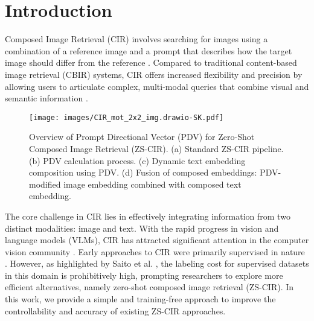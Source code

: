 \section{Introduction}
\label{sec:intro}



Composed Image Retrieval (CIR) involves searching for images using a combination of a reference image and a prompt that describes how the target image should differ from the reference \cite{ vo2019composing, baldrati2022effective,baldrati2023zero,saito2023pic2word}. Compared to traditional content-based image retrieval (CBIR) systems, CIR offers increased flexibility and precision by allowing users to articulate complex, multi-modal queries that combine visual and semantic information \cite{saito2023pic2word,karthik2024visionbylanguage,cohen2022my}. %

\begin{figure*}[!ht]
	\centering
	\texttt{[image: images/CIR\_mot\_2x2\_img.drawio-SK.pdf]}
	\caption{Overview of Prompt Directional Vector (PDV) for Zero-Shot Composed Image Retrieval (ZS-CIR). (a) Standard ZS-CIR pipeline. (b) PDV calculation process. (c) Dynamic text embedding composition using PDV. (d) Fusion of composed embeddings: PDV-modified image embedding combined with composed text embedding.}
	\label{fig:motiv}
\end{figure*}

The core challenge in CIR lies in effectively integrating information from two distinct modalities: image and text. With the rapid progress in vision and language models (VLMs), CIR has attracted significant attention in the computer vision community \cite{liu2021image,baldrati2022effective,karthik2024visionbylanguage,saito2023pic2word,baldrati2023zero}. Early approaches to CIR were primarily supervised in nature \cite{kim2021dual,anwaar2021compositional,vo2019composing,chen2020learning,wu2021fashion,lee2021cosmo}. However, as highlighted by Saito et al. \cite{saito2023pic2word}, the labeling cost for supervised datasets in this domain is prohibitively high, prompting researchers to explore more efficient alternatives, namely zero-shot composed image retrieval (ZS-CIR). In this work, we provide a simple and training-free approach to improve the controllability and accuracy of existing ZS-CIR approaches.

